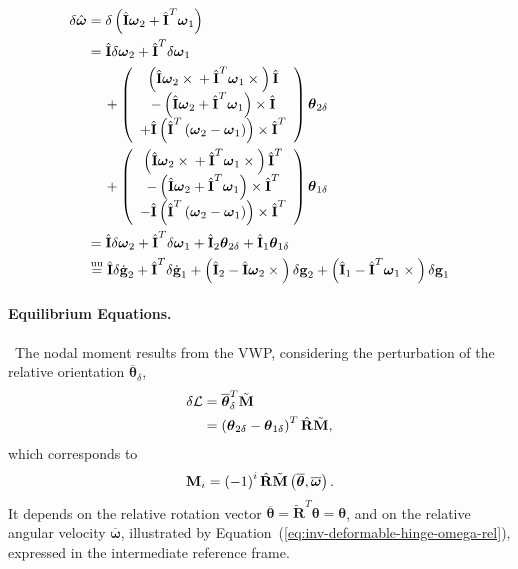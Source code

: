 \documentclass[10pt,dvips,fleqn,subeqn]{report}
\newcommand{\T}[1]{\bm{\mathbf{#1}}}
\newcommand{\equu}{\overset{\text{uu}}{=}}
\begin{document}
\begin{align}
	\delta\hat{\T{\omega}} &= 
	\delta\plbr{
		\hat{\T{I}} \T{\omega}_2
		+ \hat{\T{I}}^T \T{\omega}_1
	} \nonumber \\
	&= \hat{\T{I}} \delta\T{\omega}_2
		+ \hat{\T{I}}^T \delta\T{\omega}_1
	\nonumber \\
	&\mbox{\hspace{12pt}}
	+ \plbr{\cvvect{
		\plbr{
			\hat{\T{I}} \T{\omega}_2 \times{}
			+ \hat{\T{I}}^T \T{\omega}_1 \times{}
		} \hat{\T{I}} \\
		- \plbr{
			\hat{\T{I}} \T{\omega}_2 + \hat{\T{I}}^T \T{\omega}_1
		} \times \hat{\T{I}} \\
		+ \hat{\T{I}} \plbr{
			\hat{\T{I}}^T \plbr{
				\T{\omega}_2 - \T{\omega}_1
			}
		}\times \hat{\T{I}}^T
	}} \T{\theta}_{2\delta} \nonumber \\
	&\mbox{\hspace{12pt}}
	+ \plbr{\cvvect{
		\plbr{
			\hat{\T{I}} \T{\omega}_2 \times{}
			+ \hat{\T{I}}^T \T{\omega}_1 \times{}
		} \hat{\T{I}}^T \\
		- \plbr{
			\hat{\T{I}} \T{\omega}_2 + \hat{\T{I}}^T \T{\omega}_1
		} \times \hat{\T{I}}^T \\
		- \hat{\T{I}} \plbr{
			\hat{\T{I}}^T \plbr{
				\T{\omega}_2 - \T{\omega}_1
			}
		}\times \hat{\T{I}}^T
	}} \T{\theta}_{1\delta} \nonumber \\
	&= \hat{\T{I}} \delta\T{\omega}_2
		+ \hat{\T{I}}^T \delta\T{\omega}_1
	+ \hat{\T{I}}_2 \T{\theta}_{2\delta}
	+ \hat{\T{I}}_1 \T{\theta}_{1\delta} \nonumber \\
	&\equu
	\hat{\T{I}} \delta\dot{\T{g}}_2
		+ \hat{\T{I}}^T \delta\dot{\T{g}}_1
	+ \plbr{\hat{\T{I}}_2 - \hat{\T{I}} \T{\omega}_2\times{}}
		\delta\T{g}_2
	+ \plbr{\hat{\T{I}}_1 - \hat{\T{I}}^T \T{\omega}_1\times{}}
		\delta\T{g}_1
	\label{eq:deformable-displacement-invariant-delta-hat-omega}
\end{align}




\paragraph{Equilibrium Equations.} \
The nodal moment results from the VWP, considering the perturbation 
of the relative orientation $\overline{\T{\theta}}_{\delta}$,
\begin{align}
	\delta\mathcal{L}
	& = \overline{\T{\theta}}_{\delta}^T \tilde{\T{M}} \nonumber \\
	&= \plbr{
		\T{\theta}_{2\delta} - \T{\theta}_{1\delta}
	}^T \hat{\T{R}} \tilde{\T{M}} ,
\end{align}
which corresponds to
\begin{equation}
	\T{M}_i = \plbr{-1}^i \hat{\T{R}}
		\tilde{\T{M}}\plbr{\overline{\T{\theta}}, \overline{\T{\omega}}} .
\end{equation}
It depends on the relative rotation vector
$\overline{\T{\theta}}=\tilde{\T{R}}^T\T{\theta}=\T{\theta}$,
and on the relative angular velocity $\overline{\T{\omega}}$,
illustrated by Equation~(\ref{eq:inv-deformable-hinge-omega-rel}),
expressed in the intermediate reference frame.
\end{document}
